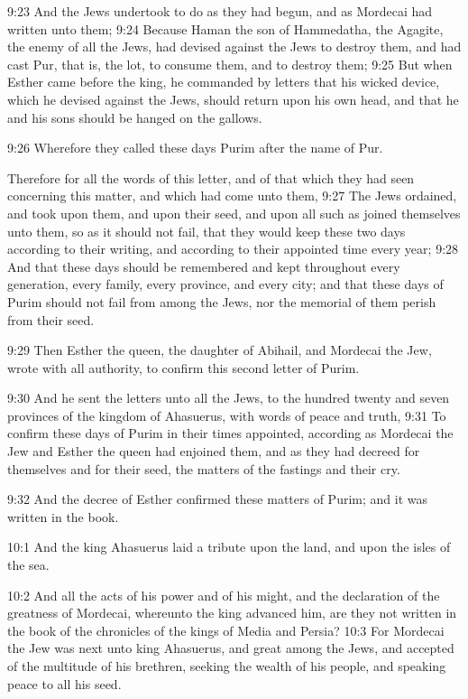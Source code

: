 9:23 And the Jews undertook to do as they had begun, and as Mordecai had written unto them; 9:24 Because Haman the son of Hammedatha, the Agagite, the enemy of all the Jews, had devised against the Jews to destroy them, and had cast Pur, that is, the lot, to consume them, and to destroy them; 9:25 But when Esther came before the king, he commanded by letters that his wicked device, which he devised against the Jews, should return upon his own head, and that he and his sons should be hanged on the gallows.

9:26 Wherefore they called these days Purim after the name of Pur.

Therefore for all the words of this letter, and of that which they had seen concerning this matter, and which had come unto them, 9:27 The Jews ordained, and took upon them, and upon their seed, and upon all such as joined themselves unto them, so as it should not fail, that they would keep these two days according to their writing, and according to their appointed time every year; 9:28 And that these days should be remembered and kept throughout every generation, every family, every province, and every city; and that these days of Purim should not fail from among the Jews, nor the memorial of them perish from their seed.

9:29 Then Esther the queen, the daughter of Abihail, and Mordecai the Jew, wrote with all authority, to confirm this second letter of Purim.

9:30 And he sent the letters unto all the Jews, to the hundred twenty and seven provinces of the kingdom of Ahasuerus, with words of peace and truth, 9:31 To confirm these days of Purim in their times appointed, according as Mordecai the Jew and Esther the queen had enjoined them, and as they had decreed for themselves and for their seed, the matters of the fastings and their cry.

9:32 And the decree of Esther confirmed these matters of Purim; and it was written in the book.

10:1 And the king Ahasuerus laid a tribute upon the land, and upon the isles of the sea.

10:2 And all the acts of his power and of his might, and the declaration of the greatness of Mordecai, whereunto the king advanced him, are they not written in the book of the chronicles of the kings of Media and Persia?  10:3 For Mordecai the Jew was next unto king Ahasuerus, and great among the Jews, and accepted of the multitude of his brethren, seeking the wealth of his people, and speaking peace to all his seed.

